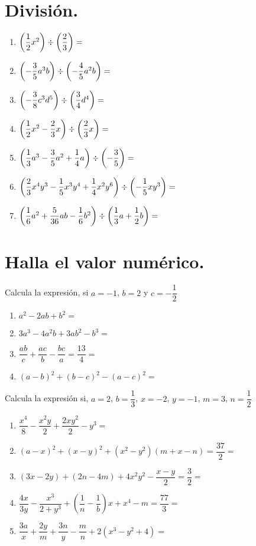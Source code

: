 \documentclass[14pt]{extarticle}
\begin{document}
\section{División.}

\begin{enumerate}
\item $\left( \dfrac{1}{2} x^{2} \right) \divisionsymbol \left( \dfrac{2}{3} \right) =$
\item $\left( - \dfrac{3}{5} a^{3} b \right) \divisionsymbol \left( - \dfrac{4}{5} a^{2} b \right) =$
\item $\left( - \dfrac{3}{8} c^{3} d^{5} \right) \divisionsymbol \left( \dfrac{3}{4} d^{4} \right) =$
\item $\left( \dfrac{1}{2} x^{2} - \dfrac{2}{3} x \right) \divisionsymbol \left( \dfrac{2}{3} x \right) =$
\item $\left( \dfrac{1}{3} a^{3} - \dfrac{3}{5} a^{2} + \dfrac{1}{4} a \right) \divisionsymbol \left( - \dfrac{3}{5} \right) =$
\item $\left( \dfrac{2}{3} x^{4} y^{3} - \dfrac{1}{5} x^{3} y^{4} + \dfrac{1}{4} x^{2} y^{6} \right) \divisionsymbol \left( - \dfrac{1}{5} x y^{3} \right) =$
\item $\left( \dfrac{1}{6} a^{2} + \dfrac{5}{36} a b - \dfrac{1}{6} b^{2} \right) \divisionsymbol \left( \dfrac{1}{3} a + \dfrac{1}{2} b \right) =$
\end{enumerate}

\section{Halla el valor numérico.}

Calcula la expresión, si $a = -1$, $b = 2$ y $c = - \dfrac{1}{2}$

\begin{enumerate}
\item $a^{2} - 2 a b + b^{2} =$
\item $3 a^{3} - 4 a^{2} b + 3 a b^{2} - b^{3} =$
\item $\dfrac{a b}{c} + \dfrac{a c}{b} - \dfrac{b c}{a} = \dfrac{13}{4} =$
\item $(a - b)^{2} + (b - c)^{2} - (a - c)^{2} =$
\end{enumerate}

Calcula la expresión si, $a = 2$, $b = \dfrac{1}{3}$, $x = -2$, $y = -1$, $m = 3$, $n = \dfrac{1}{2}$

\begin{enumerate}
\item $\dfrac{x^{4}}{8} - \dfrac{x^{2} y}{2} + \dfrac{2 x y^{2}}{2} - y^{3} =$
\item $(a - x)^{2} + (x - y)^{2} + (x^{2} - y^{2}) (m + x - n) = \dfrac{37}{2} =$
\item $(3 x - 2 y) + (2 n - 4 m) + 4 x^{2} y^{2} - \dfrac{x - y}{2} = \dfrac{3}{2} =$
\item $\dfrac{4 x}{3 y} - \dfrac{x^{3}}{2 + y^{3}} + \left( \dfrac{1}{n} - \dfrac{1}{b} \right) x + x^{4} - m = \dfrac{77}{3} =$
\item $\dfrac{3 a}{x} + \dfrac{2 y}{m} + \dfrac{3 n}{y} - \dfrac{m}{n} + 2 (x^{3} - y^{2} + 4) =$
\end{enumerate}
\end{document}
